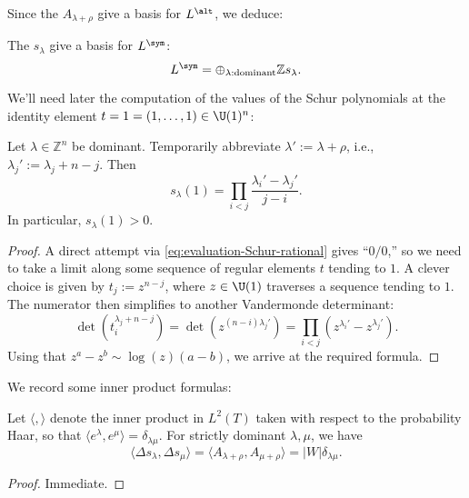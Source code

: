 \documentclass[reqno]{amsart} 
\begin{document}
Since the $A_{\lambda+\rho}$ give a basis for $L^{\alt}$, we deduce:
\begin{lemma}
  The $s_\lambda$ give a basis for $L^{\sym}$:
  \begin{equation*}
    L^{\sym} = \oplus _{\lambda:\text{dominant}} \mathbb{Z} s_\lambda.
  \end{equation*}
\end{lemma}
We'll need later the computation of the values of the Schur polynomials at the identity element $t = 1 = (1,\dotsc,1) \in \U(1)^n$:
\begin{lemma}\label{lem:schur-evalu-at-1-U-n}
  Let $\lambda \in \mathbb{Z}^n$ be dominant.  Temporarily abbreviate $\lambda ' := \lambda + \rho$, i.e., $\lambda_j' := \lambda_j + n - j$.  Then
  \begin{equation*}
    s_\lambda(1) = \prod_{i < j} \frac{\lambda_i' - \lambda_j'}{j - i}.
  \end{equation*}
  In particular, $s_\lambda(1) > 0$.
\end{lemma}
\begin{proof}
  A direct attempt via \eqref{eq:evaluation-Schur-rational} gives ``$0/0$,'' so we need to take a limit along some sequence of regular elements $t$ tending to $1$.  A clever choice is given by $t_j := z^{n-j}$, where $z \in \U(1)$ traverses a sequence tending to $1$.  The numerator then simplifies to another Vandermonde determinant:
  \begin{equation*}
    \det(t_i^{\lambda_j + n-j}) = \det(z^{(n-i) \lambda_j'}) = \prod_{i < j} (z^{\lambda_i'} - z^{\lambda_j'}).
  \end{equation*}
  Using that $z^a - z^b \sim \log(z) (a - b)$, we arrive at the required formula.
\end{proof}

We record some inner product formulas:
\begin{lemma}\label{lem:inner-products-symmetric-functions}
  Let $\langle , \rangle$ denote the inner product in $L^2(T)$ taken with respect to the probability Haar, so that $\langle e^\lambda, e^\mu \rangle = \delta_{\lambda \mu}$.  For strictly dominant $\lambda, \mu$, we have
  \begin{equation*}
    \langle \Delta s_\lambda, \Delta s_\mu \rangle = \langle A_{\lambda+\rho}, A_{\mu+\rho} \rangle = |W| \delta_{\lambda \mu}.
  \end{equation*}
\end{lemma}
\begin{proof}
  Immediate.
\end{proof}
\end{document}

